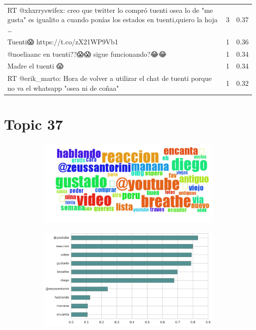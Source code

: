 \begin{longtable}{p{12.5cm}rr}
RT @xhxrryswifex: creo que twitter lo compró tuenti osea lo de "me gusta" es igualito a cuando ponías los estados en tuenti,quiero la hoja … & 3 & 0.37 \\
Tuenti😱 https://t.co/zX21WP9Vb1 & 1 & 0.36 \\
@noeliaanc en tuenti??😱😱 sigue funcionando?😂😂 & 1 & 0.34 \\
Madre el tuenti 😱 & 1 & 0.34 \\
RT @erik\_marto: Hora de volver a utilizar el  chat de tuenti porque no va el whatsapp "osea ni de coñaa" & 1 & 0.32 \\

\end{longtable}
\clearpage

\section{Topic 37}

\begin{figure}[htbp!]
    \centering
    \begin{subfigure}[b]{0.49\textwidth}
        \includegraphics[width=\textwidth]{twitter_all/report_images/topic-37-wordcloud.jpg}
    \end{subfigure}
    \begin{subfigure}[b]{0.49\textwidth}
        \includegraphics[width=\textwidth]{twitter_all/report_images/topic-37-terms.jpg}
    \end{subfigure}
\end{figure}

